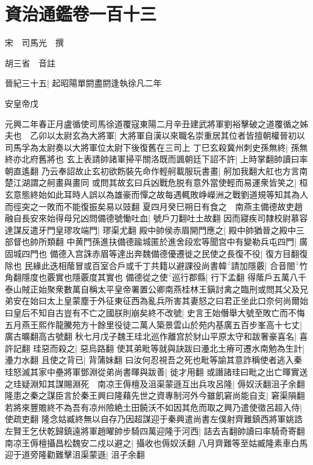\section{資治通鑑卷一百十三}


宋　司馬光　撰

胡三省　音註

晉紀三十五|{
	起昭陽單閼盡閼逢執徐凡二年}


安皇帝戊

元興二年春正月盧循使司馬徐道覆寇東陽二月辛丑建武將軍劉裕擊破之道覆循之姊夫也　乙卯以太尉玄為大將軍|{
	大將軍自漢以來職名崇重居其位者皆擅朝權晉初以司馬孚為太尉奏以大將軍位太尉下後復舊在三司上}
丁巳玄殺冀州刺史孫無終|{
	孫無終亦北府舊將也}
玄上表請帥諸軍掃平關洛既而諷朝廷下詔不許|{
	上時掌翻帥讀曰率朝直遙翻}
乃云奉詔故止玄初欲飭裝先命作輕舸載服玩書畫|{
	舸加我翻大舡也方言南楚江湖謂之舸畫與畫同}
或問其故玄曰兵凶戰危脱有意外當使輕而易運衆皆笑之|{
	桓玄意態終始如此耳時人誤以為雄豪而憚之故每遇輒敗峥嶸洲之戰劉道規等知其為人而徑突之一敗而不能復振矣易以豉翻}
夏四月癸巳朔日有食之　南燕主備德故吏趙融自長安來始得母兄凶問備德號慟吐血|{
	號戶刀翻吐土故翻}
因而寢疾司隸校尉慕容達謀反遣牙門皇璆攻端門|{
	璆渠尤翻}
殿中帥侯赤眉開門應之|{
	殿中帥猶晉之殿中三部督也帥所類翻}
中黄門孫進扶備德踰城匿於進舍段宏等聞宫中有變勒兵屯四門|{
	廣固城四門也}
備德入宫誅赤眉等達出奔魏備德優遷徙之民使之長復不役|{
	復方目翻復除也}
民緣此迭相䕃冒或百室合戶或千丁共籍以避課役尚書韓請加隱覈|{
	合音閤竹角翻隱度也覈實也隱覈度其實也}
備德從之使巡行郡縣|{
	行下孟翻}
得䕃戶五萬八千　泰山賊正始聚衆數萬自稱太平皇帝署置公卿南燕桂林王鎭討禽之臨刑或問其父及兄弟安在始曰太上皇蒙塵于外征東征西為亂兵所害其妻怒之曰君正坐此口奈何尚爾始曰皇后不知自古豈有不亡之國朕則崩矣終不改號|{
	史言王始僭舉大號至敗亡而不悔}
五月燕王熙作龍騰苑方十餘里役徒二萬人築景雲山於苑内基廣五百步峯高十七丈|{
	廣古曠翻高古號翻}
秋七月戊子魏王珪北巡作離宫於豺山平原太守和跋奢豪喜名|{
	喜許記翻}
珪惡而殺之|{
	惡烏路翻}
使其弟毗等就與訣跋曰灅北土瘠可遷水南勉為生計|{
	灅力水翻}
且使之背已|{
	背蒲妹翻}
曰汝何忍視吾之死也毗等諭其意詐稱使者逃入秦珪怒滅其家中壘將軍鄧淵從弟尚書暉與跋善|{
	徙才用翻}
或譖諸珪曰毗之出亡暉實送之珪疑淵知其謀賜淵死　南凉王傉檀及沮渠蒙遜互出兵攻呂隆|{
	傉奴沃翻沮子余翻}
隆患之秦之謀臣言於秦王興曰隆藉先世之資專制河外今雖飢窘尚能自支|{
	窘渠隕翻}
若將來豐贍終不為吾有凉州險絶土田饒沃不如因其危而取之興乃遣使徵呂超入侍|{
	使疏吏翻}
隆念姑臧終無以自存乃因超謀迎于秦興遣尚書左僕射齊難鎮西將軍姚誥左賢王乞伏乾歸鎮遠將軍趙曜帥步騎四萬迎隆于河西|{
	詰去吉翻帥讀曰率騎奇寄翻}
南凉王傉檀攝昌松魏安二戍以避之|{
	攝收也傉奴沃翻}
八月齊難等至姑臧隆素車白馬迎于道旁隆勸難擊沮渠蒙遜|{
	沮子余翻}
